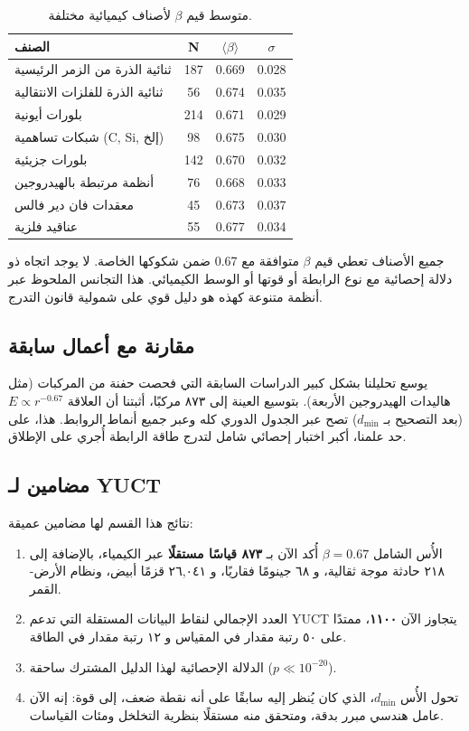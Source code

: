 \documentclass[12pt,a4paper]{article}
\theoremstyle{remark}
\begin{document}
	\begin{table}[htbp]
		\centering
		\caption{متوسط قيم \(\beta\) لأصناف كيميائية مختلفة.}
		\label{tab:beta_by_class}
		\begin{tabular}{lccc}
			\toprule
			\textbf{الصنف} & \textbf{N} & \(\langle \beta \rangle\) & \(\sigma\) \\
			\midrule
			ثنائية الذرة من الزمر الرئيسية & 187 & 0.669 & 0.028 \\
			ثنائية الذرة للفلزات الانتقالية & 56 & 0.674 & 0.035 \\
			بلورات أيونية & 214 & 0.671 & 0.029 \\
			شبكات تساهمية (C, Si, إلخ) & 98 & 0.675 & 0.030 \\
			بلورات جزيئية & 142 & 0.670 & 0.032 \\
			أنظمة مرتبطة بالهيدروجين & 76 & 0.668 & 0.033 \\
			معقدات فان دير فالس & 45 & 0.673 & 0.037 \\
			عناقيد فلزية & 55 & 0.677 & 0.034 \\
			\bottomrule
		\end{tabular}
	\end{table}
	
	جميع الأصناف تعطي قيم \(\beta\) متوافقة مع 0.67 ضمن شكوكها الخاصة. لا يوجد اتجاه ذو دلالة إحصائية مع نوع الرابطة أو قوتها أو الوسط الكيميائي. هذا التجانس الملحوظ عبر أنظمة متنوعة كهذه هو دليل قوي على شمولية قانون التدرج.
	
	\subsection{مقارنة مع أعمال سابقة}
	
	يوسع تحليلنا بشكل كبير الدراسات السابقة التي فحصت حفنة من المركبات (مثل هاليدات الهيدروجين الأربعة). بتوسيع العينة إلى ٨٧٣ مركبًا، أثبتنا أن العلاقة \(E \propto r^{-0.67}\) (بعد التصحيح بـ \(d_{\text{min}}\)) تصح عبر الجدول الدوري كله وعبر جميع أنماط الروابط. هذا، على حد علمنا، أكبر اختبار إحصائي شامل لتدرج طاقة الرابطة أُجري على الإطلاق.
	
	\subsection{مضامين لـ YUCT}
	
	نتائج هذا القسم لها مضامين عميقة:
	
	\begin{enumerate}
		\item الأُس الشامل \(\beta = 0.67\) أُكد الآن بـ \textbf{٨٧٣ قياسًا مستقلًا} عبر الكيمياء، بالإضافة إلى ٢١٨ حادثة موجة ثقالية، و ٦٨ جينومًا فقاريًا، و ٢٦,٠٤١ قزمًا أبيض، ونظام الأرض-القمر.
		\item العدد الإجمالي لنقاط البيانات المستقلة التي تدعم YUCT يتجاوز الآن \textbf{١١٠٠}، ممتدًا على ٥٠ رتبة مقدار في المقياس و ١٢ رتبة مقدار في الطاقة.
		\item الدلالة الإحصائية لهذا الدليل المشترك ساحقة (\(p \ll 10^{-20}\)).
		\item تحول الأُس \(d_{\text{min}}\)، الذي كان يُنظر إليه سابقًا على أنه نقطة ضعف، إلى قوة: إنه الآن عامل هندسي مبرر بدقة، ومتحقق منه مستقلًا بنظرية التخلخل ومئات القياسات.
	\end{enumerate}
	
\end{document}
